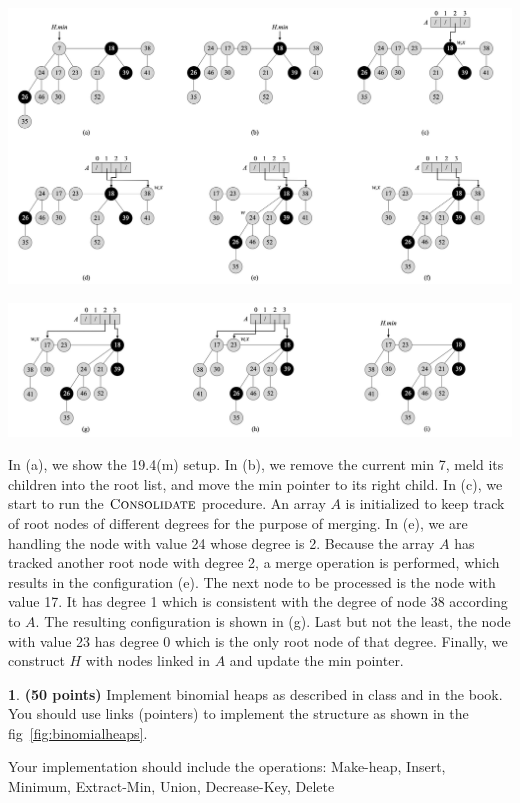 \documentclass[11pt]{article}
\theoremstyle{definition}
\theoremstyle{theorem}
\newtheorem{prob}{}
\newcommand{\solution}{\medskip\noindent{\color{DarkBlue}\textbf{Solution:}}}
\begin{document}
\solution

\includegraphics[scale=0.5]{./hw9q3-1.png}

\includegraphics[scale=0.5]{./hw9q3-2.png}

In (a), we show the 19.4(m) setup. In (b), we remove the current min 7, meld its children into the root list, and move the min pointer to its right child. In (c), we start to run the $\textproc{\textsc{Consolidate}}$ procedure. An array $A$ is initialized to keep track of root nodes of different degrees for the purpose of merging. In (e), we are handling the node with value 24 whose degree is 2. Because the array $A$ has tracked another root node with degree 2, a merge operation is performed, which results in the configuration (e). The next node to be processed is the node with value 17. It has degree 1 which is consistent with the degree of node 38 according to $A$. The resulting configuration is shown in (g). Last but not the least, the node with value 23 has degree 0 which is the only root node of that degree. Finally, we construct $H$ with nodes linked in $A$ and update the min pointer.



\newpage
\begin{prob} \textbf{(50 points)} Implement  binomial  heaps  as  described  in  class  and  in  the  book.   You should use links (pointers) to implement the structure as shown in the fig~\ref{fig:binomialheaps}.  

Your implementation should include the operations:  Make-heap, Insert, Minimum, Extract-Min, Union, Decrease-Key, Delete
\end{prob}
\end{document}
